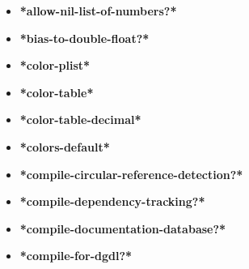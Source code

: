 \documentclass [11pt]{book}
\begin{document}
\begin{itemize}

\item {}
\label{prim:*allow-nil-list-of-numbers?*}
\textbf{*allow-nil-list-of-numbers?*}





\item {}
\label{prim:*bias-to-double-float?*}
\textbf{*bias-to-double-float?*}





\item {}
\label{prim:*color-plist*}
\textbf{*color-plist*}





\item {}
\label{prim:*color-table*}
\textbf{*color-table*}





\item {}
\label{prim:*color-table-decimal*}
\textbf{*color-table-decimal*}





\item {}
\label{prim:*colors-default*}
\textbf{*colors-default*}





\item {}
\label{prim:*compile-circular-reference-detection?*}
\textbf{*compile-circular-reference-detection?*}





\item {}
\label{prim:*compile-dependency-tracking?*}
\textbf{*compile-dependency-tracking?*}





\item {}
\label{prim:*compile-documentation-database?*}
\textbf{*compile-documentation-database?*}





\item {}
\label{prim:*compile-for-dgdl?*}
\textbf{*compile-for-dgdl?*}






\end{itemize}
\end{document}
